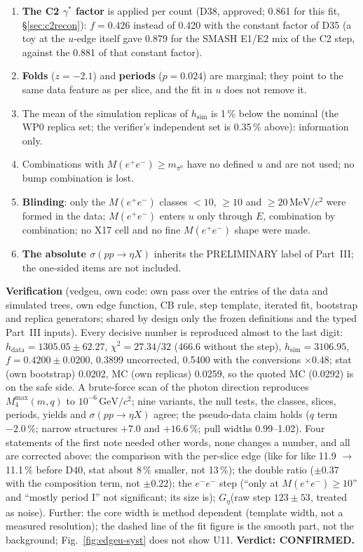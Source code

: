 \documentclass[11pt,a4paper]{article}
\newcommand{\piz}{\ensuremath{\pi^{0}}\xspace}
\newcommand{\Mee}{\ensuremath{M(e^{+}e^{-})}\xspace}
\newcommand{\GeVcc}{\ensuremath{\mathrm{GeV}/c^{2}}\xspace}
\newcommand{\MeVcc}{\ensuremath{\mathrm{MeV}/c^{2}}\xspace}
\newcommand{\sigeta}{\ensuremath{\sigma(pp\to\eta X)}\xspace}
\newcommand{\Geta}{\ensuremath{G_\eta}\xspace}
\begin{document}
\begin{enumerate}
      decay radiates, adding about 10\,\% to the tail, which SMASH lacks), not by the data. Counted: $t=1\pm0.5$, i.e.\ $\pm3.4$\,\% (D40, approved).
\item \textbf{The C2 $\gamma^*$ factor} is applied per count (D38, approved; 0.861 for this fit, \S\ref{sec:c2recon}): $f=0.426$ instead of
      0.420 with the constant factor of D35 (a toy at the $u$-edge itself gave 0.879 for the SMASH E1/E2 mix of the C2 step, against the 0.881 of
      that constant factor).
\item \textbf{Folds} ($z=-2.1$) and \textbf{periods} ($p=0.024$) are marginal; they point to the same data feature as per slice, and the fit in
      $u$ does not remove it.
\item The mean of the simulation replicas of $h_{\mathrm{sim}}$ is 1\,\% below the nominal (the WP0 replica set; the verifier's independent set is
      0.35\,\% above): information only.
\item Combinations with \Mee$\ge m_{\piz}$ have no defined $u$ and are not used; no bump combination is lost.
\item \textbf{Blinding}: only the \Mee classes $<10$, $\ge10$ and $\ge20$\,\MeVcc were formed in the data; \Mee enters $u$ only through $E$, combination
      by combination; no X17 cell and no fine \Mee shape were made.
\item \textbf{The absolute \sigeta} inherits the PRELIMINARY label of Part~III; the one-sided items are not included.
\end{enumerate}

\textbf{Verification} (vedgeu, own code: own pass over the entries of the data and simulated trees, own edge function, CB rule, step template, iterated fit,
bootstrap and replica generators; shared by design only the frozen definitions and the typed Part~III inputs). Every decisive number is
reproduced almost to the last digit: $h_{\mathrm{data}}=1305.05\pm62.27$, $\chi^2=27.34/32$ (466.6 without the step), $h_{\mathrm{sim}}=3106.95$,
$f=0.4200\pm0.0200$, 0.3899 uncorrected, 0.5400 with the conversions $\times0.48$; stat (own bootstrap) 0.0202, MC (own replicas) 0.0259, so the
quoted MC (0.0292) is on the safe side. A brute-force scan of the photon direction reproduces $M_4^{\max}(m,q)$ to $10^{-6}$\,\GeVcc; nine
variants, the null tests, the classes, slices, periods, yields and \sigeta agree; the pseudo-data claim holds ($q$ term $-2.0$\,\%; narrow
structures $+7.0$ and $+16.6$\,\%; pull widths 0.99--1.02). Four statements of the first note needed other words, none changes a number, and all
are corrected above: the comparison with the per-slice edge (like for like 11.9 $\to$ 11.1\,\% before D40, stat about 8\,\% smaller, not 13\,\%); the double
ratio ($\pm0.37$ with the composition term, not $\pm0.22$); the $e^-e^-$ step (``only at \Mee$\ge10$'' and ``mostly period I'' not significant;
its size is); \Geta (raw step $123\pm53$, treated as noise). Further: the core width is method dependent (template width, not a measured
resolution); the dashed line of the fit figure is the smooth part, not the background; Fig.~\ref{fig:edgeu-syst} does not show U11.
\textbf{Verdict: CONFIRMED.}
\end{document}
